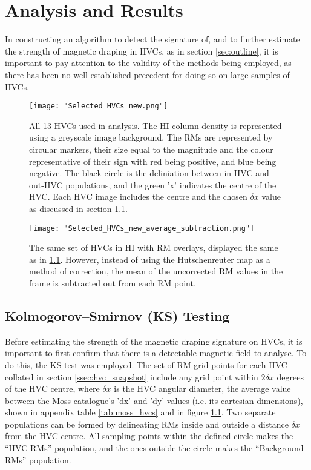 \chapter{Analysis and Results}
\label{cha:derivation}

In constructing an algorithm to detect the signature of, and to further estimate the strength of magnetic draping in HVCs, as in section \ref{sec:outline}, it is important to pay attention to the validity of the methods being employed, as there has been no well-established precedent for doing so on large samples of HVCs.

\begin{figure}
    \texttt{[image: "Selected\_HVCs\_new.png"]}
    \centering
    \caption{All 13 HVCs used in analysis. The HI column density is represented using a greyscale image background. The RMs are represented by circular markers, their size equal to the magnitude and the colour representative of their sign with red being positive, and blue being negative. The black circle is the deliniation between in-HVC and out-HVC populations, and the green 'x' indicates the centre of the HVC. Each HVC image includes the centre and the chosen $\delta x$ value as discussed in section \ref{sec:KStest}.}
    \label{fig:all_hvcs}
\end{figure}

\begin{figure}
    \texttt{[image: "Selected\_HVCs\_new\_average\_subtraction.png"]}
    \centering
    \caption{The same set of HVCs in HI with RM overlays, displayed the same as in \ref{fig:all_hvcs}. However, instead of using the Hutschenreuter map as a method of correction, the mean of the uncorrected RM values in the frame is subtracted out from each RM point.}
    \label{fig:all_hvcs_avg}
\end{figure}

\section{Kolmogorov–Smirnov (KS) Testing}
\label{sec:KStest}

Before estimating the strength of the magnetic draping signature on HVCs, it is important to first confirm that there is a detectable magnetic field to analyse. To do this, the KS test was employed. The set of RM grid points for each HVC collated in section \ref{ssec:hvc_snapshot} include any grid point within $2\delta x$ degrees of the HVC centre, where $\delta x$ is the HVC angular diameter, the average value between the Moss catalogue's 'dx' and 'dy' values (i.e. its cartesian dimensions), shown in appendix table \ref{tab:moss_hvcs} and in figure \ref{fig:all_hvcs}. Two separate populations can be formed by delineating RMs inside and outside a distance $\delta x$ from the HVC centre. All sampling points within the defined circle makes the “HVC RMs” population, and the ones outside the circle makes the “Background RMs” population.


